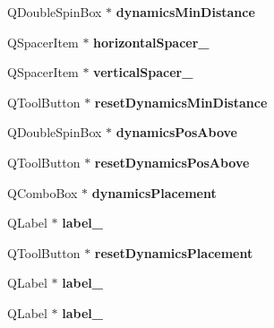 \begin{DoxyCompactItemize}
Q\+Double\+Spin\+Box $\ast$ {\bfseries dynamics\+Min\+Distance}
\item 
\mbox{\label{class_ui___edit_style_base_a639994125bb2b1bce91bc2c6b3b3b9ed}} 
Q\+Spacer\+Item $\ast$ {\bfseries horizontal\+Spacer\+\_}
\item 
\mbox{\label{class_ui___edit_style_base_a4bd055ab449f2a69ab81fff63344c3e4}} 
Q\+Spacer\+Item $\ast$ {\bfseries vertical\+Spacer\+\_}
\item 
\mbox{\label{class_ui___edit_style_base_a2f0a6e62b1b686d98de3646bc62654b8}} 
Q\+Tool\+Button $\ast$ {\bfseries reset\+Dynamics\+Min\+Distance}
\item 
\mbox{\label{class_ui___edit_style_base_af03871290e1528ab8fe2b8eb137fd9e2}} 
Q\+Double\+Spin\+Box $\ast$ {\bfseries dynamics\+Pos\+Above}
\item 
\mbox{\label{class_ui___edit_style_base_a0b1913a423d7f421c75974961d9a1347}} 
Q\+Tool\+Button $\ast$ {\bfseries reset\+Dynamics\+Pos\+Above}
\item 
\mbox{\label{class_ui___edit_style_base_a83c3cf3f79fa499089c5111f4f76791e}} 
Q\+Combo\+Box $\ast$ {\bfseries dynamics\+Placement}
\item 
\mbox{\label{class_ui___edit_style_base_a4684af5c3ffcd78d42fe4204cac4bd35}} 
Q\+Label $\ast$ {\bfseries label\+\_}
\item 
\mbox{\label{class_ui___edit_style_base_a030014005c3d3269dd58b316168a8f6b}} 
Q\+Tool\+Button $\ast$ {\bfseries reset\+Dynamics\+Placement}
\item 
\mbox{\label{class_ui___edit_style_base_a693bb257fd217d8f8fbbb88148583dfd}} 
Q\+Label $\ast$ {\bfseries label\+\_}
\item 
\mbox{\label{class_ui___edit_style_base_ac409313b24b26cdc81114c0306883a1a}} 
Q\+Label $\ast$ {\bfseries label\+\_}

\end{DoxyCompactItemize}
